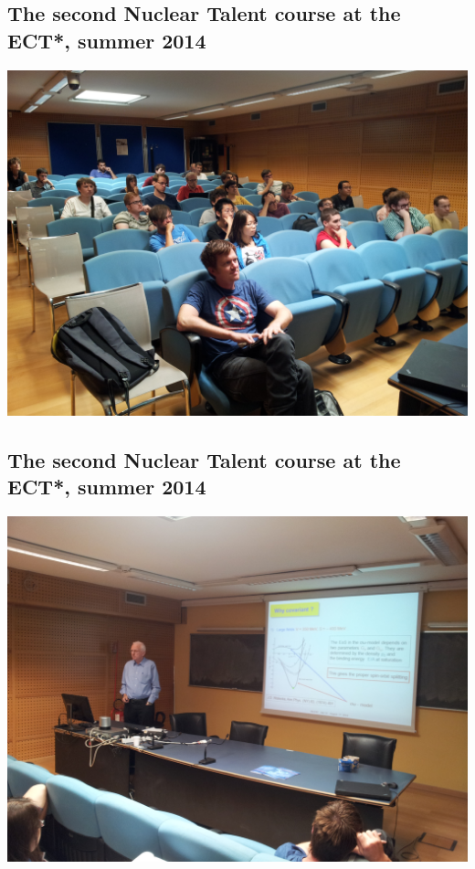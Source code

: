 \documentclass[%
oneside,                 %
final,                   %
10pt]{article}
\begin{document}
\vspace{6mm}

\subsection{The second Nuclear Talent course at the ECT*, summer 2014}

\vspace{6mm}

\centerline{\includegraphics[width=1.0\linewidth]{Photos/talent2014a.jpg}}

\vspace{6mm}

\subsection{The second Nuclear Talent course at the ECT*, summer 2014}

\vspace{6mm}

\centerline{\includegraphics[width=1.0\linewidth]{Photos/talent2014b.jpg}}
\end{document}
